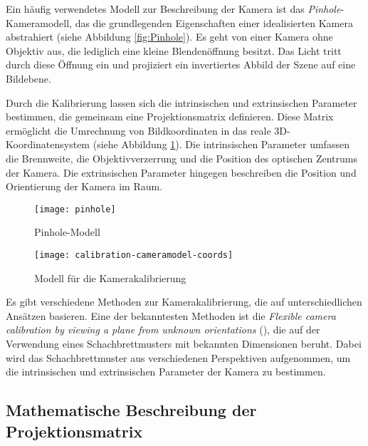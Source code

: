 Ein häufig verwendetes Modell zur Beschreibung der Kamera ist das \emph{Pinhole}-Kameramodell, das die grundlegenden Eigenschaften einer idealisierten Kamera abstrahiert (siehe Abbildung \ref{fig:Pinhole}). Es geht von einer Kamera ohne Objektiv aus, die lediglich eine kleine Blendenöffnung besitzt. Das Licht tritt durch diese Öffnung ein und projiziert ein invertiertes Abbild der Szene auf eine Bildebene. \cite{mw2024calibration}

Durch die Kalibrierung lassen sich die intrinsischen und extrinsischen Parameter bestimmen, die gemeinsam eine Projektionsmatrix definieren. Diese Matrix ermöglicht die Umrechnung von Bildkoordinaten in das reale 3D-Koordinatensystem (siehe Abbildung \ref{fig:Kalibrierung}). Die intrinsischen Parameter umfassen die Brennweite, die Objektivverzerrung und die Position des optischen Zentrums der Kamera. Die extrinsischen Parameter hingegen beschreiben die Position und Orientierung der Kamera im Raum. \cite{mw2024calibration}

\begin{figure}[h]
    \centering
    \begin{minipage}{0.45\textwidth}
        \centering
        \texttt{[image: pinhole]}
        \caption{Pinhole-Modell \cite{mw2024calibration}\label{fig:Pinhole}}
    \end{minipage}
    \hfill
    \begin{minipage}{0.45\textwidth}
        \centering
        \texttt{[image: calibration-cameramodel-coords]}
        \caption{Modell für die Kamerakalibrierung \cite{mw2024calibration}\label{fig:Kalibrierung}}
    \end{minipage}
\end{figure}

Es gibt verschiedene Methoden zur Kamerakalibrierung, die auf unterschiedlichen Ansätzen basieren. Eine der bekanntesten Methoden ist die \emph{Flexible camera calibration by viewing a plane from unknown orientations} (\citet{zhang1999calibration}), die auf der Verwendung eines Schachbrettmusters mit bekannten Dimensionen beruht. Dabei wird das Schachbrettmuster aus verschiedenen Perspektiven aufgenommen, um die intrinsischen und extrinsischen Parameter der Kamera zu bestimmen. \cite{stachniss2021calibration, zhang1999calibration}

\subsection{Mathematische Beschreibung der Projektionsmatrix}

